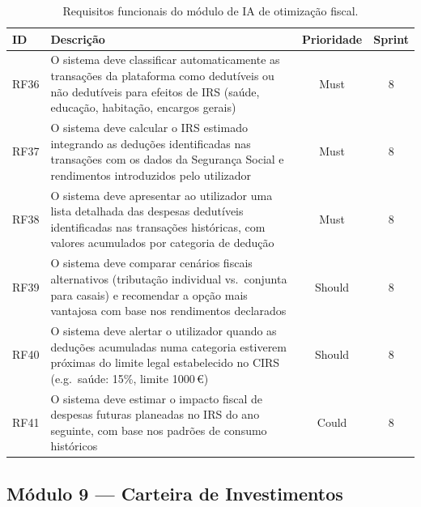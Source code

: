\begin{table}[H]
\centering
\caption{Requisitos funcionais do módulo de IA de otimização fiscal.}
\label{tab:rf-fiscal-ia}
\small
\begin{tabularx}{\textwidth}{l X c c}
\toprule
\textbf{ID} & \textbf{Descrição} & \textbf{Prioridade} & \textbf{Sprint} \\
\midrule
RF36 & O sistema deve classificar automaticamente as transações da plataforma como dedutíveis ou não dedutíveis para efeitos de \ac{IRS} (saúde, educação, habitação, encargos gerais) & Must & 8 \\
RF37 & O sistema deve calcular o \ac{IRS} estimado integrando as deduções identificadas nas transações com os dados da Segurança Social e rendimentos introduzidos pelo utilizador & Must & 8 \\
RF38 & O sistema deve apresentar ao utilizador uma lista detalhada das despesas dedutíveis identificadas nas transações históricas, com valores acumulados por categoria de dedução & Must & 8 \\
RF39 & O sistema deve comparar cenários fiscais alternativos (tributação individual vs.\ conjunta para casais) e recomendar a opção mais vantajosa com base nos rendimentos declarados & Should & 8 \\
RF40 & O sistema deve alertar o utilizador quando as deduções acumuladas numa categoria estiverem próximas do limite legal estabelecido no \ac{CIRS} (e.g.\ saúde: 15\%, limite 1000\,€) & Should & 8 \\
RF41 & O sistema deve estimar o impacto fiscal de despesas futuras planeadas no \ac{IRS} do ano seguinte, com base nos padrões de consumo históricos & Could & 8 \\
\bottomrule
\end{tabularx}
\end{table}

\subsection{Módulo 9 --- Carteira de Investimentos}

